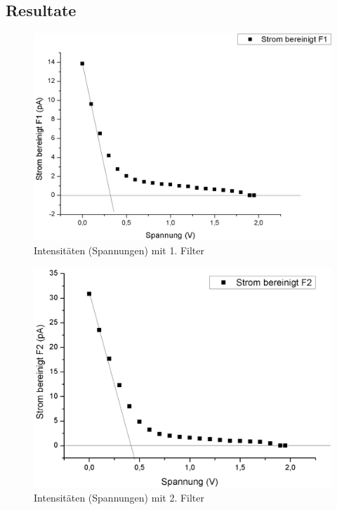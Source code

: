 \documentclass[12pt,a4paper]{article}
\begin{document}
\subsection{Resultate}


\begin{figure}[H]
	\centering
	\includegraphics[scale=0.5]{./data/Filter1.png}
	\caption{Intensitäten (Spannungen) mit 1. Filter}
	\label{fig:filter1}
\end{figure}

\begin{figure}[H]
	\centering
	\includegraphics[scale=0.5]{./data/Filter2.png}
	\caption{Intensitäten (Spannungen) mit 2. Filter}
	\label{fig:filter2}
\end{figure}
\end{document}
